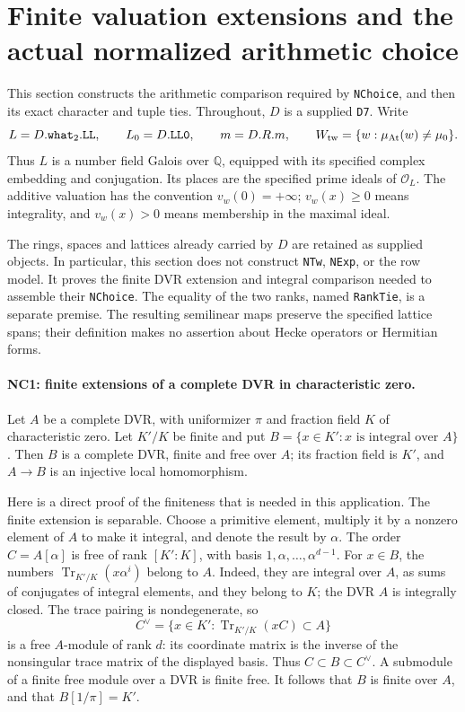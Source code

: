 \section{Finite valuation extensions and the actual normalized arithmetic choice}
\label{sec:arithmetic-choice}

This section constructs the arithmetic comparison required by
\texttt{NChoice}, and then its exact character and tuple ties.
Throughout, \(D\) is a supplied \texttt{D7}. Write
\[
 L=D.\texttt{what}_2.\texttt{LL},\qquad L_0=D.\texttt{LL0},
 \qquad m=D.R.m,\qquad
 W_{\rm tw}=\{w:\mu_{\rm At}(w)\ne\mu_0\}.
\]
Thus \(L\) is a number field Galois over \(\mathbb Q\), equipped
with its specified complex embedding and conjugation. Its places
are the specified prime ideals of \(\mathcal O_L\).
The additive valuation has the convention \(v_w(0)=+\infty\);
\(v_w(x)\geq0\) means integrality, and \(v_w(x)>0\) means
membership in the maximal ideal.

The rings, spaces and lattices already carried by \(D\) are
retained as supplied objects. In particular, this section does
not construct \texttt{NTw}, \texttt{NExp}, or the row model.
It proves the finite DVR extension and integral comparison
needed to assemble their \texttt{NChoice}. The equality of the
two ranks, named \texttt{RankTie}, is a separate premise.
The resulting semilinear maps preserve the specified lattice
spans; their definition makes no assertion about Hecke operators
or Hermitian forms.

\paragraph{NC1: finite extensions of a complete DVR in characteristic zero.}
Let \(A\) be a complete DVR, with uniformizer \(\pi\) and fraction
field \(K\) of characteristic zero. Let \(K'/K\) be finite and put
\(B=\{x\in K':x\text{ is integral over }A\}\).
Then \(B\) is a complete DVR, finite and free over \(A\);
its fraction field is \(K'\), and \(A\longrightarrow B\) is an
injective local homomorphism.

Here is a direct proof of the finiteness that is needed in this
application. The finite extension is separable. Choose a primitive
element, multiply it by a nonzero element of \(A\) to make it
integral, and denote the result by \(\alpha\).
The order \(C=A[\alpha]\) is free of rank \([K':K]\), with
basis \(1,\alpha,\ldots,\alpha^{d-1}\).
For \(x\in B\), the numbers
\(\operatorname{Tr}_{K'/K}(x\alpha^i)\) belong to \(A\).
Indeed, they are integral over \(A\), as sums of conjugates of
integral elements, and they belong to \(K\); the DVR \(A\) is
integrally closed. The trace pairing is nondegenerate, so
\[
 C^\vee=\{x\in K':\operatorname{Tr}_{K'/K}(xC)\subset A\}
\]
is a free \(A\)-module of rank \(d\): its coordinate matrix is
the inverse of the nonsingular trace matrix of the displayed
basis. Thus \(C\subset B\subset C^\vee\).
A submodule of a finite free module over a DVR is finite free.
It follows that \(B\) is finite over \(A\), and that
\(B[1/\pi]=K'\).

